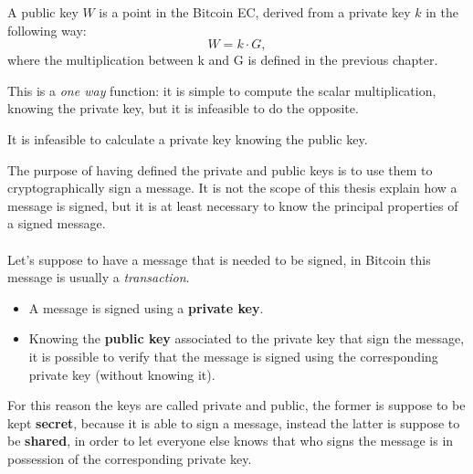 \begin{definition}
	A public key $W$ is a point in the Bitcoin EC, derived from a private key $k$ in the following way: \\
	\begin{equation}
	W=k\cdot G,
	\end{equation}
	where the multiplication between k and G is defined in the previous chapter.
\end{definition}
This is a \textit{one way} function: it is simple to compute the scalar multiplication, knowing the private key, but it is infeasible to do the opposite.
\begin{remark}
	It is infeasible to calculate a private key knowing the public key.
\end{remark}
The purpose of having defined the private and public keys is to use them to cryptographically sign a message. It is not the scope of this thesis explain how a message is signed, but it is at least necessary to know the principal properties of a signed message.
\\ \\
Let's suppose to have a message that is needed to be signed, in Bitcoin this message is usually a \textit{transaction}.

\begin{itemize}
	\item A message is signed using a \textbf{private key}.
	\item Knowing the \textbf{public key} associated to the private key that sign the message, it is possible to verify that the message is signed using the corresponding private key (without knowing it).
\end{itemize}
For this reason the keys are called private and public, the former is suppose to be kept \textbf{secret}, because it is able to sign a message, instead the latter is suppose to be \textbf{shared}, in order to let everyone else knows that who signs the message is in possession of the corresponding private key.





